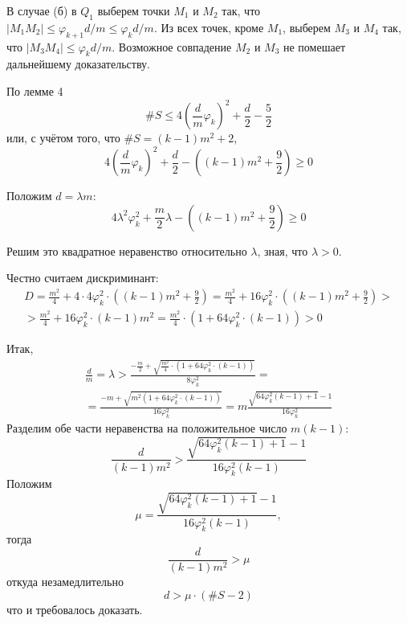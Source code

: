 \documentclass[a4paper,14pt]{article} %
\begin{document}
В случае (б) в $Q_1$ выберем точки $M_1$ и $M_2$ так, что
$|M_1 M_2| \leq \varphi_{k+1} d /m \leq \varphi_k d /m$.
Из всех точек, кроме $M_1$, выберем $M_3$ и $M_4$ так, что
$|M_3 M_4| \leq \varphi_k d/m$.
Возможное совпадение $M_2$ и $M_3$ не помешает дальнейшему доказательству.

По лемме 4
\begin{equation}
	\#S \leq 4 \left( \frac{d}{m} \varphi_k \right)^2 + \frac{d}{2} - \frac{5}{2}
\end{equation}
или, с учётом того, что $ \#S = (k-1)m^2 + 2$,
\begin{equation}
	 4 \left( \frac{d}{m} \varphi_k \right)^2 + \frac{d}{2} - \left( (k-1)m^2 + \frac{9}{2}\right) \geq 0
\end{equation}

Положим $d = \lambda m$:
\begin{equation}
	 4 \lambda^2 \varphi_k^2 + \frac{m}{2} \lambda - \left( (k-1)m^2 + \frac{9}{2}\right) \geq 0
\end{equation}

Решим это квадратное неравенство относительно $\lambda$,
зная, что $\lambda > 0$.

Честно считаем дискриминант:
\begin{multline}
	D =
	\frac{m^2}{4} + 4 \cdot 4 \varphi_k^2 \cdot \left( (k-1)m^2 + \frac{9}{2}\right)
	=
	\frac{m^2}{4} + 16 \varphi_k^2 \cdot \left( (k-1)m^2 + \frac{9}{2}\right)
	>\\>
	\frac{m^2}{4} + 16 \varphi_k^2 \cdot (k-1)m^2
	=
	\frac{m^2}{4} \cdot (1 + 64 \varphi_k^2 \cdot (k-1))
	> 0
\end{multline}

Итак,
\begin{multline}
	\frac{d}{m} = \lambda >
	\frac{-\frac{m}{2} + \sqrt{\frac{m^2}{4} \cdot (1 + 64 \varphi_k^2 \cdot (k-1))} }{8 \varphi_k^2}
	=\\=
	\frac{-m + \sqrt{m^2  (1 + 64 \varphi_k^2 \cdot (k-1))} }{16 \varphi_k^2}
	=
	m\frac{ \sqrt{ 64 \varphi_k^2 (k-1) + 1} -1 }{16 \varphi_k^2}
\end{multline}
Разделим обе части неравенства на положительное число $m(k-1)$:
\begin{equation}
	\frac{d}{(k-1)m^2}
	>
	\frac{ \sqrt{ 64 \varphi_k^2 (k-1) + 1} -1 }{16 \varphi_k^2 (k-1)}
\end{equation}
Положим
\begin{equation}
	\mu = \frac{ \sqrt{ 64 \varphi_k^2 (k-1) + 1} -1 }{16 \varphi_k^2 (k-1)},
\end{equation}
тогда
\begin{equation}
	\frac{d}{(k-1)m^2}
	>
	\mu
\end{equation}
откуда незамедлительно
\begin{equation}
	d > \mu \cdot (\#S-2)
\end{equation}
что и требовалось доказать.
\end{document}
